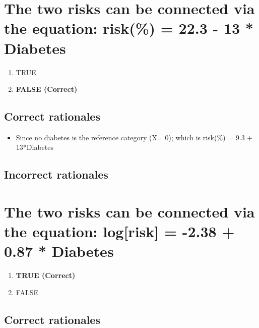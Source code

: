 \documentclass[letterpaper,9pt,twoside,]{pinp}
\providecommand{\tightlist}{%
  \setlength{\itemsep}{0pt}\setlength{\parskip}{0pt}}
\begin{document}
\hypertarget{the-two-risks-can-be-connected-via-the-equation-risk-22.3---13-diabetes}{%
\section{The two risks can be connected via the equation: risk(\%) =
22.3 - 13 *
Diabetes}\label{the-two-risks-can-be-connected-via-the-equation-risk-22.3---13-diabetes}}

\begin{enumerate}
\def\labelenumi{\alph{enumi}.}
\tightlist
\item
  TRUE
\item
  \textbf{FALSE (Correct)}
\end{enumerate}

\hypertarget{correct-rationales-3}{%
\subsection{Correct rationales}\label{correct-rationales-3}}

\begin{itemize}
\tightlist
\item
  Since no diabetes is the reference category (X= 0); which is risk(\%)
  = 9.3 + 13*Diabetes
\end{itemize}

\hypertarget{incorrect-rationales-3}{%
\subsection{Incorrect rationales}\label{incorrect-rationales-3}}

\hypertarget{the-two-risks-can-be-connected-via-the-equation-logrisk--2.38-0.87-diabetes}{%
\section{The two risks can be connected via the equation: log{[}risk{]}
= -2.38 + 0.87 *
Diabetes}\label{the-two-risks-can-be-connected-via-the-equation-logrisk--2.38-0.87-diabetes}}

\begin{enumerate}
\def\labelenumi{\alph{enumi}.}
\tightlist
\item
  \textbf{TRUE (Correct)}
\item
  FALSE
\end{enumerate}

\hypertarget{correct-rationales-4}{%
\subsection{Correct rationales}\label{correct-rationales-4}}
\end{document}
